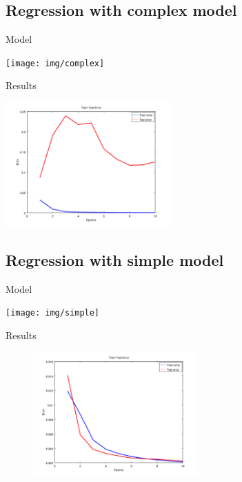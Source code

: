 \documentclass{beamer}
\begin{document}
\subsection{Regression with complex model}
\begin{frame}{Model}
	
	\begin{center}
		\hspace*{-0.7cm}
		\texttt{[image: img/complex]}
    \end{center}
\end{frame}

\begin{frame}{Results}
	\begin{center}
		\includegraphics[width=240px,height=180px]{img/train-test-100}
    \end{center}
\end{frame}


\subsection{Regression with simple model}
\begin{frame}{Model}
	\begin{center}
		\hspace*{-0.6cm}
		\texttt{[image: img/simple]}
    \end{center}
\end{frame}

\begin{frame}{Results}
\begin{figure}[h]
	\begin{center}
		\includegraphics[width=240px,height=180px]{img/small-network}
    \end{center}
\end{figure}

\end{frame}
\end{document}
